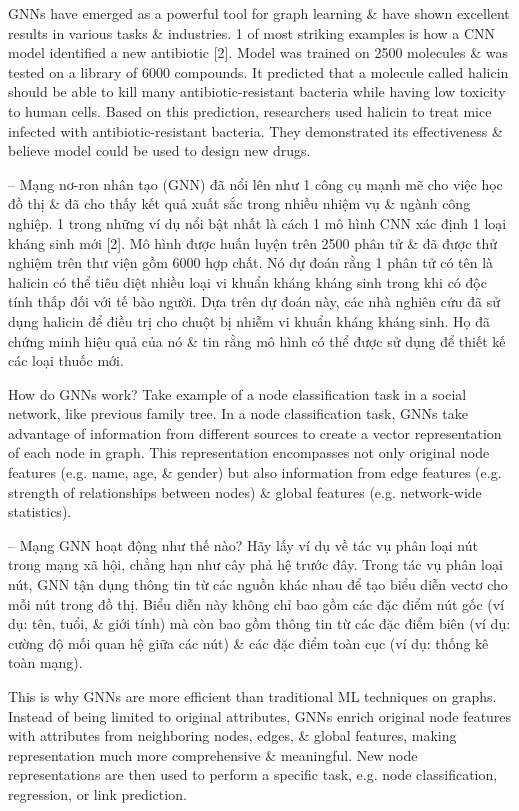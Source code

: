 \documentclass{article}
\begin{document}
\begin{itemize}
\begin{itemize}
        GNNs have emerged as a powerful tool for graph learning \& have shown excellent results in various tasks \& industries. 1 of most striking examples is how a CNN model identified a new antibiotic [2]. Model was trained on 2500 molecules \& was tested on a library of 6000 compounds. It predicted that a molecule called halicin should be able to kill many antibiotic-resistant bacteria while having low toxicity to human cells. Based on this prediction, researchers used halicin to treat mice infected with antibiotic-resistant bacteria. They demonstrated its effectiveness \& believe model could be used to design new drugs.

        -- Mạng nơ-ron nhân tạo (GNN) đã nổi lên như 1 công cụ mạnh mẽ cho việc học đồ thị \& đã cho thấy kết quả xuất sắc trong nhiều nhiệm vụ \& ngành công nghiệp. 1 trong những ví dụ nổi bật nhất là cách 1 mô hình CNN xác định 1 loại kháng sinh mới [2]. Mô hình được huấn luyện trên 2500 phân tử \& đã được thử nghiệm trên thư viện gồm 6000 hợp chất. Nó dự đoán rằng 1 phân tử có tên là halicin có thể tiêu diệt nhiều loại vi khuẩn kháng kháng sinh trong khi có độc tính thấp đối với tế bào người. Dựa trên dự đoán này, các nhà nghiên cứu đã sử dụng halicin để điều trị cho chuột bị nhiễm vi khuẩn kháng kháng sinh. Họ đã chứng minh hiệu quả của nó \& tin rằng mô hình có thể được sử dụng để thiết kế các loại thuốc mới.

        How do GNNs work? Take example of a node classification task in a social network, like previous family tree. In a node classification task, GNNs take advantage of information from different sources to create a vector representation of each node in graph. This representation encompasses not only original node features (e.g. name, age, \& gender) but also information from edge features (e.g. strength of relationships between nodes) \& global features (e.g. network-wide statistics).

        -- Mạng GNN hoạt động như thế nào? Hãy lấy ví dụ về tác vụ phân loại nút trong mạng xã hội, chẳng hạn như cây phả hệ trước đây. Trong tác vụ phân loại nút, GNN tận dụng thông tin từ các nguồn khác nhau để tạo biểu diễn vectơ cho mỗi nút trong đồ thị. Biểu diễn này không chỉ bao gồm các đặc điểm nút gốc (ví dụ: tên, tuổi, \& giới tính) mà còn bao gồm thông tin từ các đặc điểm biên (ví dụ: cường độ mối quan hệ giữa các nút) \& các đặc điểm toàn cục (ví dụ: thống kê toàn mạng).

        This is why GNNs are more efficient than traditional ML techniques on graphs. Instead of being limited to original attributes, GNNs enrich original node features with attributes from neighboring nodes, edges, \& global features, making representation much more comprehensive \& meaningful. New node representations are then used to perform a specific task, e.g. node classification, regression, or link prediction.


\end{itemize}
\end{itemize}
\end{document}
